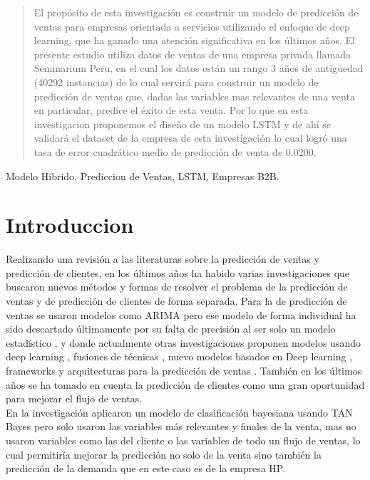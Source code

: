 \documentclass[conference]{IEEEtran}
\begin{document}
\begin{abstract}
 El propósito de esta investigación es construir un modelo de predicción de ventas para empresas orientada a servicios utilizando el enfoque 
 de deep learning, que ha ganado una atención significativa en los últimos años. El presente estudio utiliza datos de ventas de una empresa privada 
 llamada Seminarium Peru, en el cual los datos están un rango 3 años de antigüedad (40292 instancias) de lo cual servirá para construir un modelo 
 de predicción de ventas que, dadas las variables mas relevantes de una venta en particular, predice el éxito de esta venta. Por lo que en 
esta investigacion proponemos el diseño de un modelo LSTM y de ahí se validará el dataset de la empresa de esta investigación lo cual 
logró una tasa de error cuadrático medio de predicción de venta de 0.0200.\end{abstract}
\begin{IEEEkeywords} 
     Modelo Hibrido, Prediccion de Ventas, LSTM, Empresas B2B.
\end{IEEEkeywords}

\section{Introduccion}
Realizando una revisión a las literaturas sobre la predicción de ventas y predicción de clientes, en los últimos años ha habido varias 
investigaciones que buscaron nuevos métodos y formas de resolver el problema de la predicción de ventas y de predicción de clientes de 
forma separada. Para la de predicción de ventas se usaron modelos como ARIMA pero ese modelo de forma individual ha sido descartado 
últimamente por su falta de precisión al ser solo un modelo estadístico , y donde actualmente otras investigaciones proponen 
modelos usando deep learning \cite{b1} \cite{b2} , fusiones de técnicas \cite{b3} \cite{b4}, nuevo modelos basados en Deep learning \cite{b5} 
\cite{b6} \cite{b7}, frameworks \cite{b8} y arquitecturas \cite{b9} para la predicción de ventas . También en los últimos años se ha tomado en 
cuenta la predicción de clientes \cite{b10} \cite{b11} \cite{b12} \cite{b13} \cite{b14} como una gran oportunidad para mejorar el flujo de ventas.\\

En la investigación \cite{b7} aplicaron un modelo de clasificación bayesiana usando TAN Bayes pero solo usaron las variables más relevantes y 
finales de la venta, mas no usaron variables como las del cliente o las variables de todo un flujo de ventas, lo cual permitiría mejorar la 
predicción no solo de la venta sino también la predicción de la demanda que en este caso es de la empresa HP.\\
\end{document}
